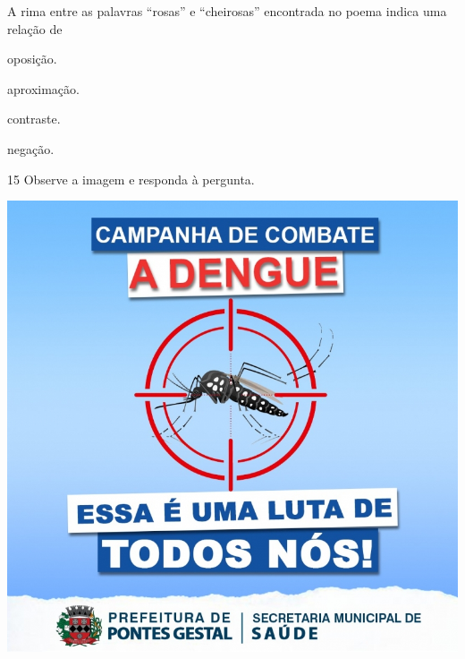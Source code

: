 A rima entre as palavras ``rosas'' e ``cheirosas'' encontrada no poema indica uma relação de

\begin{escolha}
  \item oposição.

  \item aproximação.

  \item contraste.

  \item negação.
\end{escolha}

\num{15} Observe a imagem e responda à pergunta.

\begin{myquote}
\begin{center}
\includegraphics[width=\textwidth]{./imgQ4PORT/media/image3.jpeg}
\end{center}


\end{myquote}
